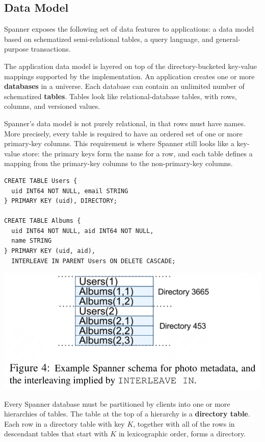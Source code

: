 \documentclass[11pt]{article}
\begin{document}
\subsection{Data Model}
\label{sec:org5b8e961}
Spanner exposes the following set of data features to applications: a data model based on schematized
semi-relational tables, a query language, and general-purpose transactions.

The application data model is layered on top of the directory-bucketed key-value mappings supported by
the implementation. An application creates one or more \textbf{databases} in a universe. Each database can
contain an unlimited number of schematized \textbf{tables}. Tables look like relational-database tables, with
rows, columns, and versioned values.

Spanner’s data model is not purely relational, in that rows must have names. More precisely, every
table is required to have an ordered set of one or more primary-key columns. This requirement is where
Spanner still looks like a key-value store: the primary keys form the name for a row, and each table
defines a mapping from the primary-key columns to the non-primary-key columns.

\begin{verbatim}
CREATE TABLE Users {
  uid INT64 NOT NULL, email STRING
} PRIMARY KEY (uid), DIRECTORY;

CREATE TABLE Albums {
  uid INT64 NOT NULL, aid INT64 NOT NULL,
  name STRING
} PRIMARY KEY (uid, aid),
  INTERLEAVE IN PARENT Users ON DELETE CASCADE;
\end{verbatim}

\begin{center}
\includegraphics[width=.5\textwidth]{../../images/papers/61.png}
\label{}
\end{center}

Every Spanner database must be partitioned by clients into one or more hierarchies of tables. The
table at the top of a hierarchy is a \textbf{directory table}. Each row in a directory table with key \(K\),
together with all of the rows in descendant tables that start with \(K\) in lexicographic order, forms
a directory.
\end{document}

